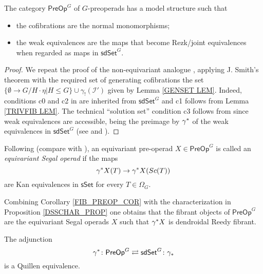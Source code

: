 \documentclass[a4paper,10pt
 ,draft
]{article}%
\begin{document}
\begin{theorem}\label{PREOPMOD THM}
	The category $\mathsf{PreOp}^G$ of $G$-preoperads has a model structure such that
	\begin{itemize}
		\item the cofibrations are the normal monomorphisms;
		\item the weak equivalences are the maps 
		that become Rezk/joint equivalences when regarded as maps in 
		$\mathsf{sdSet}^G$.
	\end{itemize}
\end{theorem}

\begin{proof}
We repeat the proof of the non-equivariant analogue \cite[Thm. 8.13]{CM13a}, applying J. Smith's theorem \cite[Thm. 1.7]{Bek00} with the required set of generating cofibrations the 
set $\{\emptyset \to G/H\cdot \eta | H \leq G\} \cup \gamma_! (\mathcal{I}')$ given by Lemma \ref{GENSET LEM}.
Indeed, conditions c0 and c2 in \cite{Bek00} are inherited from 
$\mathsf{sdSet}^G$ and c1 follows from Lemma \ref{TRIVFIB LEM}.
The technical ``solution set'' condition c3 follows from 
\cite[Prop. 1.15]{Bek00} since weak equivalences are accessible, being the preimage by $\gamma^{\**}$ of the weak equivalences in 
$\mathsf{sdSet}^G$ 
(see \cite[Cor. A.2.6.5]{Lur09} and \cite[Cor. A.2.6.6]{Lur09}). 
\end{proof}


\begin{definition}
      \label{SEGALOP_DEF}
	Following \cite[Def. 5.5]{CM13b} (compare with \cite[Def. 8.1]{CM13a}), an equivariant pre-operad $X \in \mathsf{PreOp}^G$ is called an \textit{equivariant Segal operad} if the maps
	\[
	\gamma^{\**} X (T) \to \gamma^{\**} X (Sc(T))
	\]
are Kan equivalences in $\mathsf{sSet}$ for every $T \in \Omega_G$.
\end{definition}

\begin{remark}
      \label{SEGALOP_REM}
Combining Corollary \ref{FIB_PREOP_COR} with the characterization in Proposition \ref{DSSCHAR_PROP}
one obtains that the fibrant objects of $\mathsf{PreOp}^G$ are the equivariant Segal operads $X$ such that
$\gamma^{\**} X$ is dendroidal Reedy fibrant.
\end{remark}

\begin{theorem}\label{ANOQUEQUIV THM}
The adjunction
\[
	\gamma^{\**} \colon \mathsf{PreOp}^G	
\rightleftarrows
	\mathsf{sdSet}^G \colon \gamma_{\**}
\]
is a Quillen equivalence.
\end{theorem}
\end{document}
